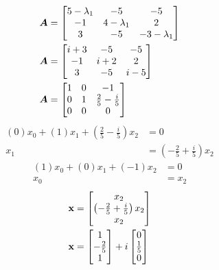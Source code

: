 \documentclass{article}
\begin{document}
\begin{align*}
	\bm{A} & = \begin{bmatrix}
		5 - \lambda_1 & -5 & -5 \\
		-1 & 4 - \lambda_1 & 2 \\
		3 & -5 & -3 - \lambda_1
	\end{bmatrix} \\
	\bm{A} & = \begin{bmatrix}
		i + 3 & -5 & -5 \\
		-1 & i + 2 & 2 \\
		3 & -5 & i - 5
	\end{bmatrix} \\
	\bm{A} & = \begin{bmatrix}
		1 & 0 & -1 \\
		0 & 1 & \frac{2}{5} - \frac{i}{5} \\
		0 & 0 & 0
	\end{bmatrix}
\end{align*}
\begin{align*}
	(0)x_0 + (1)x_1 + \left( \frac{2}{5} - \frac{i}{5} \right)x_2 & = 0 \\
	x_1 & = \left( -\frac{2}{5} + \frac{i}{5} \right)x_2
\end{align*}
\begin{align*}
	(1)x_0 + (0)x_1 + (-1)x_2 & = 0 \\
	x_0 & = x_2
\end{align*}
\begin{align*}
	\mathbf{x} & = \begin{bmatrix} x_2 \\ \left( -\frac{2}{5} + \frac{i}{5} \right)x_2 \\ x_2 \end{bmatrix} \\
	\mathbf{x} & = \begin{bmatrix} 1 \\ -\frac{2}{5} \\ 1 \end{bmatrix} + i\begin{bmatrix} 0 \\ \frac{1}{5} \\ 0 \end{bmatrix}
\end{align*}
\end{document}
